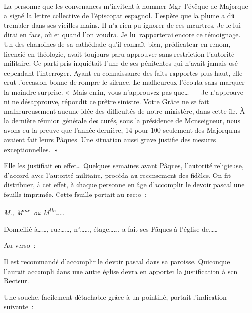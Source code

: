 \documentclass[french,twoside]{book} %
\newcommand{\astertri}{\medskip\par\centerline{\color{rubric}\large\selectfont{\syms ✻\,✻\,✻}}\medskip\par}%
\newenvironment{quoteblock}%
  {\begin{quoting}}
  {\end{quoting}}
\newenvironment{quotebar}{%
    \def\FrameCommand{{\color{rubric!10!}\vrule width 0.5em} \hspace{0.9em}}%
    \def\OuterFrameSep{\itemsep} %
    \MakeFramed {\advance\hsize-\width \FrameRestore}
  }%
  {%
    \endMakeFramed
  }
\renewenvironment{quoteblock}%
  {%
    \savenotes
    \setstretch{0.9}
    \normalfont
    \begin{quotebar}
  }
  {%
    \end{quotebar}
    \spewnotes
  }
\begin{document}
\astertri

\noindent  \par
La personne que les convenances m’invitent à nommer Mgr l’évêque de Majorque a signé la lettre collective de l’épiscopat espagnol. J’espère que la plume a dû trembler dans ses vieilles mains. Il n’a rien pu ignorer de ces meurtres. Je le lui dirai en face, où et quand l’on voudra. Je lui rapporterai encore ce témoignage. Un des chanoines de sa cathédrale qu’il connaît bien, prédicateur en renom, licencié en théologie, avait toujours paru approuver sans restriction l’autorité militaire. Ce parti pris inquiétait l’une de ses pénitentes qui n’avait jamais osé cependant l’interroger. Ayant eu connaissance des faits rapportés plus haut, elle crut l’occasion bonne de rompre le silence. Le malheureux l’écouta sans marquer la moindre surprise. « Mais enfin, vous n’approuvez pas que… — Je n’approuve ni ne désapprouve, répondit ce prêtre sinistre. Votre Grâce ne se fait malheureusement aucune idée des difficultés de notre ministère, dans cette île. À la dernière réunion générale des curés, sous la présidence de Monseigneur, nous avons eu la preuve que l’année dernière, 14 pour 100 seulement des Majorquins avaient fait leurs Pâques. Une situation aussi grave justifie des mesures exceptionnelles. »\par
Elle les justifiait en effet… Quelques semaines avant Pâques, l’autorité religieuse, d’accord avec l’autorité militaire, procéda au recensement des fidèles. On fit distribuer, à cet effet, à chaque personne en âge d’accomplir le devoir pascal une feuille imprimée. Cette feuille portait au recto :\par

\begin{quoteblock}
 \par
 \emph{M., M\textsuperscript{me} ou M\textsuperscript{lle}}……\par
 Domicilié à……, rue……, n°……, étage……, a fait ses Pâques à l’église de……
\end{quoteblock}

\noindent Au verso :\par

\begin{quoteblock}
 \noindent Il est recommandé d’accomplir le devoir pascal dans sa paroisse. Quiconque l’aurait accompli dans une autre église devra en apporter la justification à son Recteur.
\end{quoteblock}

\noindent Une souche, facilement détachable grâce à un pointillé, portait l’indication suivante :\par
\end{document}
